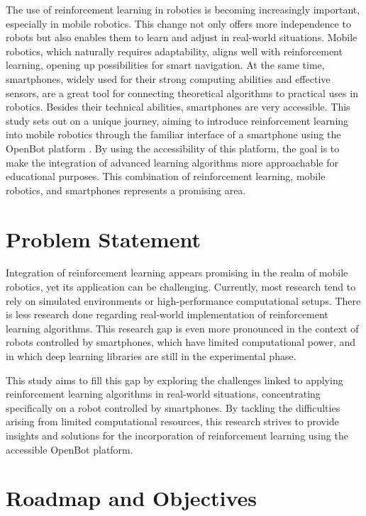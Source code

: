\documentclass[12pt]{report}
\begin{document}
The use of reinforcement learning in robotics is becoming increasingly important, especially in mobile robotics. This change not only offers more independence to robots but also enables them to learn and adjust in real-world situations. Mobile robotics, which naturally requires adaptability, aligns well with reinforcement learning, opening up possibilities for smart navigation. At the same time, smartphones, widely used for their strong computing abilities and effective sensors, are a great tool for connecting theoretical algorithms to practical uses in robotics. Besides their technical abilities, smartphones are very accessible. This study sets out on a unique journey, aiming to introduce reinforcement learning into mobile robotics through the familiar interface of a smartphone using the OpenBot platform \cite{bib:openbot}. By using the accessibility of this platform, the goal is to make the integration of advanced learning algorithms more approachable for educational purposes. This combination of reinforcement learning, mobile robotics, and smartphones represents a promising area.

\section{Problem Statement}
\label{sub:Problem_Statement}

Integration of reinforcement learning appears promising in the realm of mobile robotics, yet its application can be challenging. Currently, most research tend to rely on simulated environments or high-performance computational setups. There is less research done regarding real-world implementation of reinforcement learning algorithms. This research gap is even more pronounced in the context of robots controlled by smartphones, which have limited computational power, and in which deep learning libraries are still in the experimental phase. 


This study aims to fill this gap by exploring the challenges linked to applying reinforcement learning algorithms in real-world situations, concentrating specifically on a robot controlled by smartphones. By tackling the difficulties arising from limited computational resources, this research strives to provide insights and solutions for the incorporation of reinforcement learning using the accessible OpenBot platform.

\section{Roadmap and Objectives}
\label{sub:Roadmap and Objectives}
\end{document}
